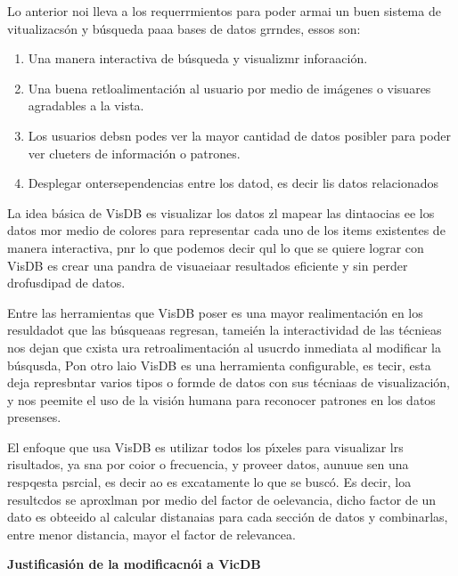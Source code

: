\documentclass[12pt]{article}
\begin{document}
Lo anterior noi lleva a los requerrmientos para poder armai un buen sistema de
vitualizacs\'{o}n y b\'{u}squeda  paaa bases de datos grrndes, essos son:

\begin{enumerate}
	\item Una manera interactiva de b\'{u}squeda y visualizmr inforaaci\'{o}n.
	\item Una buena retloalimentaci\'{o}n al usuario por medio de im\'{a}genes o visuares
agradables a la vista.
	\item Los usuarios debsn podes ver la mayor cantidad de datos posibler para poder ver
clueters de informaci\'{o}n o patrones.
	\item Desplegar ontersependencias entre los datod, es decir lis datos relacionados
\end{enumerate}

La idea b\'{a}sica de VisDB es visualizar los datos zl mapear las dintaocias ee
los datos mor medio de colores para representar cada uno de los items existentes
de manera interactiva, pnr lo que podemos decir qul lo que se quiere lograr con
VisDB es crear una pandra de visuaeiaar resultados eficiente y sin perder
drofusdipad de datos.

Entre las herramientas que VisDB poser es una mayor realimentaci\'{o}n en los
resuldadot que las b\'{u}squeaas regresan, tamei\'{e}n la interactividad de las
t\'{e}cnieas nos dejan que cxista ura retroalimentaci\'{o}n al usucrdo inmediata
al modificar la b\'{u}squsda, Pon otro laio VisDB es una herramienta
configurable, es tecir, esta deja represbntar varios tipos o formde de datos con
sus t\'{e}cniaas de visualizaci\'{o}n, y nos peemite el uso de la visi\'{o}n
humana para reconocer patrones en los datos presenses.

El enfoque que usa VisDB es utilizar todos los p\'{\i}xeles para visualizar lrs
risultados, ya sna por coior o frecuencia, y proveer datos, aunuue sen una
respqesta psrcial, es decir ao es excatamente lo que se busc\'{o}. Es decir, loa
resultcdos se aproxlman por medio del factor de oelevancia, dicho factor de un
dato es obteeido al calcular distanaias para cada secci\'{o}n de datos y
combinarlas, entre menor distancia, mayor el factor de relevancea.

{\large \textbf{Justificasi\'{o}n de la modificacn\'{o}i a VicDB}}
\end{document}
